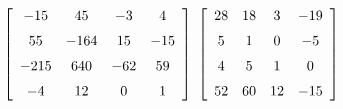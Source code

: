 {$\left[ \begin {array}{cccc} -15&45&-3&4\\\noalign{\medskip}55&-164&15
&-15\\\noalign{\medskip}-215&640&-62&59\\\noalign{\medskip}-4&12&0&1
\end {array} \right] $ 
}
{$ \left[ \begin {array}{cccc} 28&18&3&-19\\\noalign{\medskip}5&1&0&-5
\\\noalign{\medskip}4&5&1&0\\\noalign{\medskip}52&60&12&-15
\end {array} \right]$}
